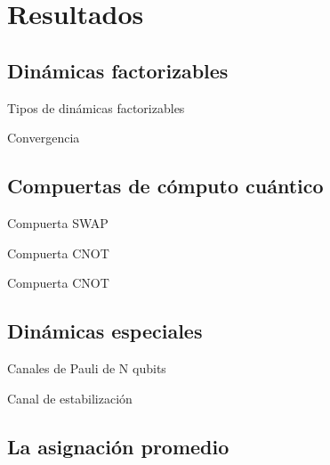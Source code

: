 \section{Resultados}

\subsection{Dinámicas factorizables}

\begin{frame}{Tipos de dinámicas factorizables}
    \lipsum[1]
\end{frame}

\begin{frame}{Convergencia}
    \lipsum[1]
\end{frame}

\subsection{Compuertas de cómputo cuántico}

\begin{frame}{Compuerta SWAP}
    \lipsum[1]
\end{frame}

\begin{frame}{Compuerta CNOT}
    \lipsum[1]
\end{frame}

\begin{frame}{Compuerta CNOT}
    \lipsum[1]
\end{frame}

\subsection*{Dinámicas especiales}

\begin{frame}{Canales de Pauli de N qubits}
    \lipsum[1]
\end{frame}

\begin{frame}{Canal de estabilización}
    \lipsum[1]
\end{frame}

\subsection{La asignación promedio}

